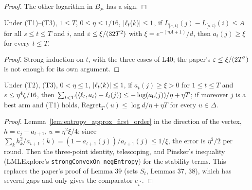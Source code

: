 \begin{proof}
  \leanok
  The other logarithm in $B_{ji}$ has a sign.
\end{proof}

\begin{lemma}
  \label{lem:entropy_best_arm_lower}
  \leanok
  Under (T1)--(T3), $1 \le T$, $0 \le \eta \le 1/16$, $\lvert \ell_t(k) \rvert \le 1$, if
  $L_{[s,t)}(j) - L_{[s,t)}(i) \le A$ for all $s \le t \le T$ and $i$, and
  $\varepsilon \le \xi/(32T^2)$ with $\xi = e^{-(\eta A + 1)}/d$, then $a_t(j) \ge \xi$ for every $t \le T$.
\end{lemma}

\begin{proof}
  \leanok
  Strong induction on $t$, with the three cases of L40; the paper's $\varepsilon \le \xi/(2T^2)$ is not
  enough for its own argument.
\end{proof}

\begin{lemma}
  \label{lem:entropy_regret_best_arm}
  \leanok
  Under (T2), (T3), $0 < \eta \le 1$, $\lvert \ell_t(k) \rvert \le 1$, if $a_t(j) \ge \xi > 0$ for
  $1 \le t \le T$ and $\varepsilon \le \eta^4\xi/16$, then
  $\sum_{t<T}(\langle \ell_t, a_t \rangle - \ell_t(j)) \le -\log(a_0(j))/\eta + \eta T$; if moreover $j$ is a
  best arm and (T1) holds, $\mathrm{Regret}_T(u) \le \log d/\eta + \eta T$ for every $u \in \Delta$.
\end{lemma}

\begin{proof}
  \leanok
  Lemma~\ref{lem:entropy_approx_first_order} in the direction of the vertex, $h = e_j - a_{t+1}$,
  $u = \eta^2\xi/4$: since $\sum_k h_k^2/a_{t+1}(k) = (1 - a_{t+1}(j))/a_{t+1}(j) \le 1/\xi$, the
  error is $\eta^2/2$ per round. Then the three-point identity, telescoping, and Pinsker's
  inequality (LMLExplore's \texttt{strongConvexOn\_negEntropy}) for the stability terms. This
  replaces the paper's proof of Lemma 39 (sets $S_t$, Lemmas 37, 38), which has several gaps and
  only gives the comparator $e_{i^*}$.
\end{proof}

